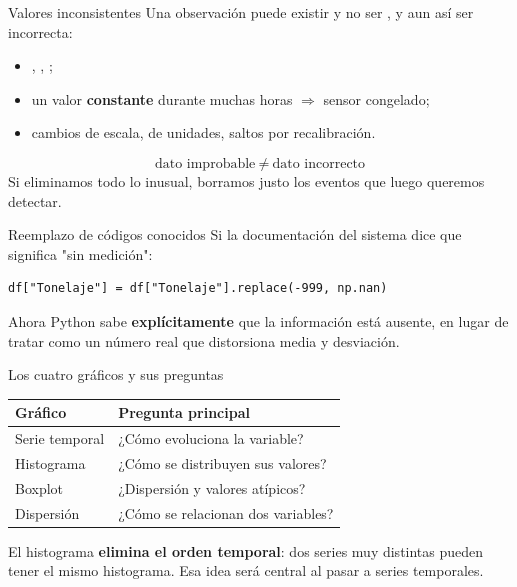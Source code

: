 \begin{frame}{Valores inconsistentes}
Una observación puede existir y no ser , y aun así ser incorrecta:
\begin{itemize}
  \item {}, , ;
  \item un valor \textbf{constante} durante muchas horas $\Rightarrow$ sensor congelado;
  \item cambios de escala, de unidades, saltos por recalibración.
\end{itemize}
\vfill
\[
\text{dato improbable}\ \neq\ \text{dato incorrecto}
\]
Si eliminamos todo lo inusual, borramos justo los eventos que luego queremos detectar.
\end{frame}

\begin{frame}[fragile]{Reemplazo de códigos conocidos}
Si la documentación del sistema dice que  significa "sin medición":
\begin{lstlisting}
df["Tonelaje"] = df["Tonelaje"].replace(-999, np.nan)
\end{lstlisting}
\vspace{0.6em}
Ahora Python sabe \textbf{explícitamente} que la información está ausente, en lugar de
tratar  como un número real que distorsiona media y desviación.
\end{frame}

\begin{frame}{Los cuatro gráficos y sus preguntas}
\begin{center}
\begin{tabular}{ll}
\toprule
Gráfico & Pregunta principal\\
\midrule
Serie temporal & ¿Cómo evoluciona la variable?\\
Histograma & ¿Cómo se distribuyen sus valores?\\
Boxplot & ¿Dispersión y valores atípicos?\\
Dispersión & ¿Cómo se relacionan dos variables?\\
\bottomrule
\end{tabular}
\end{center}
\vfill
El histograma \textbf{elimina el orden temporal}: dos series muy distintas pueden tener
el mismo histograma. Esa idea será central al pasar a series temporales.
\end{frame}

